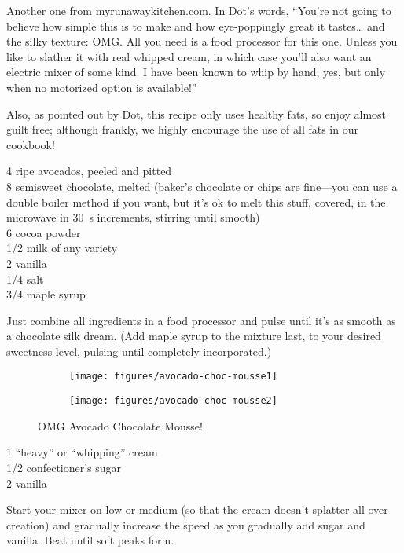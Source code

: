 \begin{open}
    Another one from \url{myrunawaykitchen.com}.  In Dot's words, ``You’re not going to believe how simple this is to make and how eye-poppingly great it tastes… and the silky texture: OMG.  All you need is a food processor for this one.  Unless you like to slather it with real whipped cream, in which case you’ll also want an electric mixer of some kind.  I have been known to whip by hand, yes, but only when no motorized option is available!''

    Also, as pointed out by Dot, this recipe only uses healthy fats, so enjoy almost guilt free; although frankly, we highly encourage the use of all fats in our cookbook!
\end{open}
\begin{ingredients}
    4 ripe avocados, peeled and pitted\\
    \SI{8}{\ounce} semisweet chocolate, melted (baker’s chocolate or chips are fine---you can use a double boiler method if you want, but it's ok to melt this stuff, covered, in the microwave in \SI{30}{\second} increments, stirring until smooth)\\
    \SI{6}{\tblspoon} cocoa powder\\
    \SI{1/2}{\cup} milk of any variety\\
    \SI{2}{\teaspoon} vanilla\\
    \SI{1/4}{\teaspoon} salt\\
    \SI{3/4}{\cup} maple syrup
\end{ingredients}
Just combine all ingredients in a food processor and pulse until it’s as smooth
as a chocolate silk dream.  (Add maple syrup to the mixture last, to your
desired sweetness level, pulsing until completely incorporated.)
\begin{figure}
    \centering
    \begin{subfigure}{0.4\textwidth}
        \centering
        \texttt{[image: figures/avocado-choc-mousse1]}
    \end{subfigure}
    \begin{subfigure}{0.4\textwidth}
        \centering
        \texttt{[image: figures/avocado-choc-mousse2]}
    \end{subfigure}
    \caption*{OMG Avocado Chocolate Mousse!}
\end{figure}


\begin{ingredients}
    \SI{1}{\quart} ``heavy'' or ``whipping'' cream\\
    \SI{1/2}{\cup} confectioner's sugar\\
    \SI{2}{\teaspoon} vanilla
\end{ingredients}
Start your mixer on low or medium (so that the cream doesn't splatter all over creation) and gradually increase the speed as you gradually add sugar and vanilla.  Beat until soft peaks form.